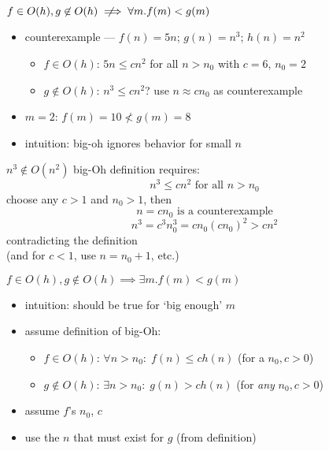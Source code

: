 \begin{frame}{\fontsize{16}{17}\selectfont $f\in O(h), g\not\in O(h) \notimplies \forall m. f(m)<g(m)$}
    \begin{itemize}
    \item counterexample --- $f(n) = 5n$; $g(n) = n^3$; $h(n) = n^2$ \\
        \begin{itemize}
            \item $f\in O(h)$: $5n\le c n^2$ for all $n>n_0$ with $c = 6$, $n_0 = 2$
            \item $g\not\in O(h)$: $n^3\le c n^2$? use $n\approx cn_0$ as counterexample
        \end{itemize}
     \item $m=2$: $f(m) = 10 \not< g(m) = 8$
    \vspace{.5cm}
    \item<2-> intuition: big-oh ignores behavior for small $n$
    \end{itemize}
\end{frame}

\begin{frame}{$n^3\not\in O(n^2)$}
big-Oh definition requires:
\[n^3 \le c n^2 \text{ for all $n > n_0$}\]
choose any $c > 1$ and $n_0 > 1$, then \\
\[
    n=cn_0 \text{ is a counterexample}
\]
\[ n^3 = c^3n_0^3 = cn_0 (cn_0)^2 > c n^2 \]
contradicting the definition
\\
{\small (and for $c < 1$, use $n = n_0+1$, etc.)}
\end{frame}

\begin{frame}{ \fontsize{16}{17}\selectfont$f\in O(h), g\not\in O(h) \implies \exists m. f(m)<g(m)$}
    \begin{itemize}
        \item intuition: should be true for `big enough' $m$
        \item assume definition of big-Oh:
            \begin{itemize}
                \item $f \in O(h)$: $\forall n>n_0:\;f(n) \le c h(n)$ (for a $n_0, c > 0$)
                \item $g \not\in O(h)$: $\exists n > n_0:\;g(n) > c h(n)$ (for \textit{any} $n_0, c > 0$)
            \end{itemize}
        \item assume $f$'s $n_0$, $c$
        \item use the $n$ that must exist for $g$ (from definition)
    \end{itemize}
\end{frame}


